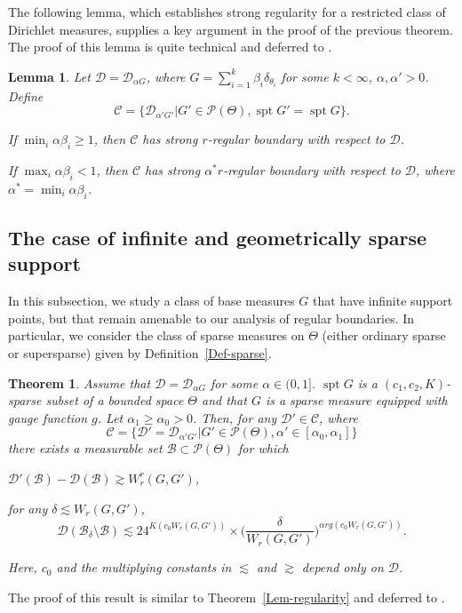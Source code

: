 \documentclass[MSNbibl,number,citesort]{arxbj}
\newtheorem{theorem}{Theorem}[section]
\newtheorem{lemma}{Lemma}[section]
\newcommand{\Dcal}{\mathcal{D}}
\newcommand{\Pcal}{\mathscr{P}}
\newcommand{\BB}{\mathscr{B}}
\newcommand{\gauge}{g}
\newcommand{\supp}{\operatorname{spt}}
\newcommand{\DP}{\mathscr{D}}
\newcommand{\Cclass}{\mathscr{C}}
\newcommand{\Wr}{W_r}
\begin{document}
The following lemma, which establishes strong regularity for a
restricted class of
Dirichlet measures, supplies a key argument in the proof of the previous
theorem. The proof of this lemma is quite technical and
deferred to %
\cite{Nguyen-hdpsupp}.

%
\begin{lemma}
\label{Lem-samespt}
Let $\Dcal= \DP_{\alpha G}$, where $G = \sum_{i=1}^{k} \beta_i
\delta
_{\theta_i}$
for some $k < \infty$, $\alpha, \alpha' > 0$.
Define
%
\[
\Cclass= \bigl\{\DP_{\alpha'G'} | G' \in\Pcal(\Theta), \supp
G' = \supp G \bigr\}.
\]
%
\begin{longlist}[(a)]
%
\item[(a)]
If $\min_{i} \alpha\beta_i \geq1$, then
$\Cclass$ has \emph{strong} $r$-regular boundary with respect to
$\Dcal$.
%
\item[(b)] If $\max_{i} \alpha\beta_i < 1$,
then
$\Cclass$ has \emph{strong} ${\alpha^*}r$-regular boundary with
respect to $\Dcal$,
where ${\alpha^*}= \min_{i} \alpha\beta_i$.
\end{longlist}
%
\end{lemma}

\subsection{The case of infinite and geometrically sparse support}

In this subsection, we study a class of base measures $G$ that
have infinite support points, but that remain amenable to our analysis of
regular boundaries. In particular,
we consider the class of sparse measures on $\Theta$
(either ordinary sparse or supersparse) given by Definition~\ref{Def-sparse}.

%
\begin{theorem}
\label{Thm-sparse}
Assume that $\Dcal=\DP_{\alpha G}$ for some $\alpha\in(0,1]$.
$\supp G$ is a $(c_1,c_2,K)$-sparse subset of a bounded space $\Theta$
and that $G$ is a sparse measure equipped with gauge function $\gauge$.
Let $\alpha_1 \geq\alpha_0 > 0$.
Then,
for any $\Dcal' \in\Cclass$, where
%
\[
\Cclass= \bigl\{\Dcal' = \DP_{\alpha'G'} | G'
\in\Pcal(\Theta), \alpha' \in[\alpha_0,
\alpha_1] \bigr\}
\]
%
there exists a measurable set $\BB\subset\Pcal(\Theta)$ for which
%
\begin{longlist}[(ii)]
%
\item[(i)] $\Dcal'(\BB) - \Dcal(\BB) \gtrsim\Wr^r(G,G')$,
%
\item[(ii)] for any $\delta\lesssim\Wr(G,G')$,
%
\[
\Dcal(\BB_\delta\setminus\BB) \lesssim24^{K(c_0\Wr(G,G'))} \times \biggl(
\frac{\delta}{\Wr(G,G')} \biggr)^{\alpha r\gauge
(c_0\Wr(G,G'))}.
\]
%
\end{longlist}
%
Here, $c_0$ and the multiplying
constants in $\lesssim$ and $\gtrsim$ depend only on $\Dcal$.
\end{theorem}
%
The proof of this result is similar to Theorem~\ref{Lem-regularity}
and deferred to \cite{Nguyen-hdpsupp}.
\end{document}
